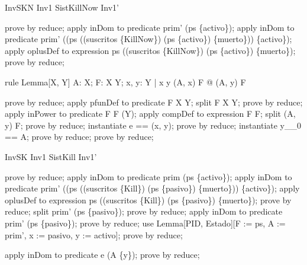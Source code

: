 \begin{theorem}{InvSKN}
Inv1 \land  SistKillNow \implies  Inv1'
\end{theorem}

\begin{zproof}[InvSKN]
prove by reduce;
apply inDom to predicate prim' \in  \dom  (ps \rres  \{activo\});
apply inDom to predicate prim' \in  \dom  ((ps \oplus  (\dom  (suscritos \rres  \{KillNow\}) \cap  \dom  (ps \rres  \{activo\}) \cross  \{muerto\})) \rres  \{activo\});
apply oplusDef to expression ps \oplus  (\dom  (suscritos \rres  \{KillNow\}) \cap  \dom  (ps \rres  \{activo\}) \cross  \{muerto\});
prove by reduce;
\end{zproof}

\begin{theorem}{rule Lemma}[X, Y]
\forall  A: X; F: X \pfun  Y; x, y: Y | x \neq  y \land  (A, x) \in  F @ (A, y) \notin  F
\end{theorem}

\begin{zproof}[Lemma]
prove by reduce;
apply pfunDef to predicate F \in  X \pfun  Y;
split F \in  X \rel  Y;
prove by reduce;
apply inPower to predicate F \inv [X, Y] \semi [Y, X, Y] F \in  \power  (\id  Y);
apply compDef to expression F \inv [X, Y] \semi [Y, X, Y] F;
split \lnot  (A, y) \in  F;
prove by reduce;
instantiate e == (x, y);
prove by reduce;
instantiate y\_\_0 == A;
prove by reduce;
prove by reduce;
\end{zproof}

\begin{theorem}{InvSK}
Inv1 \land  SistKill \implies  Inv1'
\end{theorem}

\begin{zproof}[InvSK]
prove by reduce;
apply inDom to predicate prim \in  \dom  (ps \rres  \{activo\});
apply inDom to predicate prim' \in  \dom  ((ps \oplus  (\dom  (suscritos \rres  \{Kill\}) \cap  \dom  (ps \rres  \{pasivo\}) \cross  \{muerto\})) \rres  \{activo\});
apply oplusDef to expression ps \oplus  (\dom  (suscritos \rres  \{Kill\}) \cap  \dom  (ps \rres  \{pasivo\}) \cross  \{muerto\});
prove by reduce;
split prim' \in  \dom  (ps \rres  \{pasivo\});
prove by reduce;
apply inDom to predicate prim' \in  \dom  (ps \rres  \{pasivo\});
prove by reduce;
use Lemma[PID, Estado][F := ps, A := prim', x := pasivo, y := activo];
prove by reduce;
\end{zproof}

\begin{zproof}[Teo3]
apply inDom to predicate e \in  \dom [X, Y] (A \rres [X, Y] \{y\});
prove by reduce;
\end{zproof}

